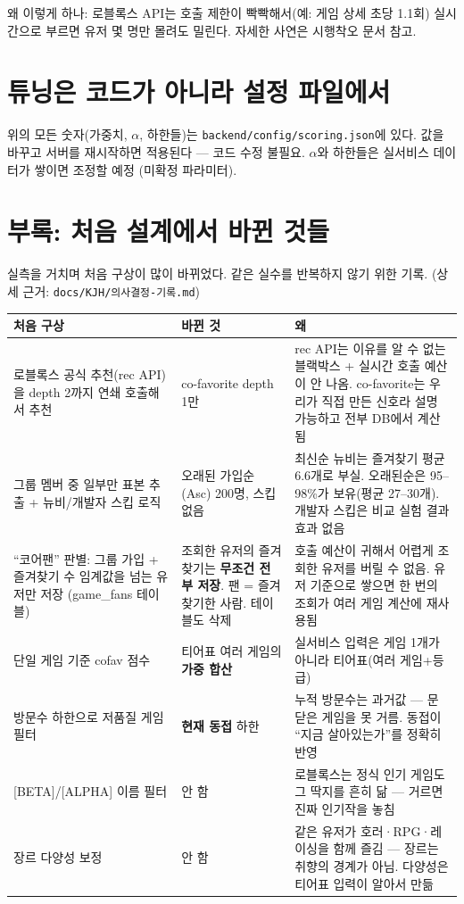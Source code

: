 \documentclass[11pt]{article}
\begin{document}
왜 이렇게 하나: 로블록스 API는 호출 제한이 빡빡해서(예: 게임 상세 초당 1.1회)
실시간으로 부르면 유저 몇 명만 몰려도 밀린다. 자세한 사연은 시행착오 문서 참고.

\section{튜닝은 코드가 아니라 설정 파일에서}

위의 모든 숫자(가중치, $\alpha$, 하한들)는 \texttt{backend/config/scoring.json}에 있다.
값을 바꾸고 서버를 재시작하면 적용된다 --- 코드 수정 불필요.
$\alpha$와 하한들은 실서비스 데이터가 쌓이면 조정할 예정 (미확정 파라미터).

\appendix
\section*{부록: 처음 설계에서 바뀐 것들}

실측을 거치며 처음 구상이 많이 바뀌었다. 같은 실수를 반복하지 않기 위한 기록.
(상세 근거: \texttt{docs/KJH/의사결정-기록.md})

\begin{center}
\small
\begin{tabular}{p{} p{} p{}}
\toprule
처음 구상 & 바뀐 것 & 왜 \\
\midrule
로블록스 공식 추천(rec API)을 depth 2까지 연쇄 호출해서 추천
& co-favorite depth 1만
& rec API는 이유를 알 수 없는 블랙박스 + 실시간 호출 예산이 안 나옴.
  co-favorite는 우리가 직접 만든 신호라 설명 가능하고 전부 DB에서 계산됨 \\
\midrule
그룹 멤버 중 일부만 표본 추출 + 뉴비/개발자 스킵 로직
& 오래된 가입순(Asc) 200명, 스킵 없음
& 최신순 뉴비는 즐겨찾기 평균 6.6개로 부실. 오래된순은 95--98\%가 보유(평균 27--30개).
  개발자 스킵은 비교 실험 결과 효과 없음 \\
\midrule
``코어팬'' 판별: 그룹 가입 + 즐겨찾기 수 임계값을 넘는 유저만 저장 (game\_fans 테이블)
& 조회한 유저의 즐겨찾기는 \textbf{무조건 전부 저장}. 팬 = 즐겨찾기한 사람. 테이블도 삭제
& 호출 예산이 귀해서 어렵게 조회한 유저를 버릴 수 없음. 유저 기준으로 쌓으면
  한 번의 조회가 여러 게임 계산에 재사용됨 \\
\midrule
단일 게임 기준 cofav 점수
& 티어표 여러 게임의 \textbf{가중 합산}
& 실서비스 입력은 게임 1개가 아니라 티어표(여러 게임+등급) \\
\midrule
방문수 하한으로 저품질 게임 필터
& \textbf{현재 동접} 하한
& 누적 방문수는 과거값 --- 문 닫은 게임을 못 거름. 동접이 ``지금 살아있는가''를 정확히 반영 \\
\midrule
{[BETA]/[ALPHA]} 이름 필터
& 안 함
& 로블록스는 정식 인기 게임도 그 딱지를 흔히 닮 --- 거르면 진짜 인기작을 놓침 \\
\midrule
장르 다양성 보정
& 안 함
& 같은 유저가 호러·RPG·레이싱을 함께 즐김 --- 장르는 취향의 경계가 아님.
  다양성은 티어표 입력이 알아서 만듦 \\
\bottomrule
\end{tabular}
\end{center}
\end{document}
